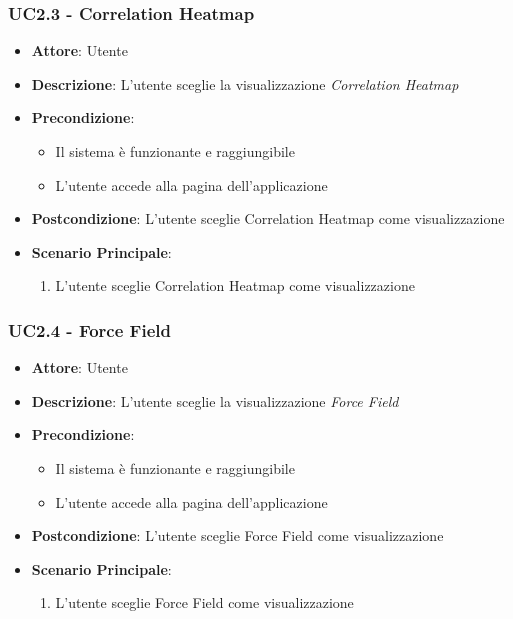     \subsubsection{UC2.3 - Correlation Heatmap}
    \label{uc2.3}
    
    \begin{itemize}
    \item \textbf{Attore}: Utente
    \item \textbf{Descrizione}: L'utente sceglie la visualizzazione \emph{Correlation Heatmap}
    \item \textbf{Precondizione}:
    \begin{itemize}
        \item Il sistema è funzionante e raggiungibile
        \item L'utente accede alla pagina dell'applicazione
    \end{itemize}
    \item \textbf{Postcondizione}: L'utente sceglie Correlation Heatmap come visualizzazione
    \item \textbf{Scenario Principale}: 
        \begin{enumerate}
            \item L'utente sceglie Correlation Heatmap come visualizzazione
        \end{enumerate}
    \end{itemize}
    
    \subsubsection{UC2.4 - Force Field}
    \label{uc2.4}
    
    \begin{itemize}
    \item \textbf{Attore}: Utente
    \item \textbf{Descrizione}: L'utente sceglie la visualizzazione \emph{Force Field}
    \item \textbf{Precondizione}:
    \begin{itemize}
        \item Il sistema è funzionante e raggiungibile
        \item L'utente accede alla pagina dell'applicazione
    \end{itemize}
    \item \textbf{Postcondizione}: L'utente sceglie Force Field come visualizzazione
    \item \textbf{Scenario Principale}: 
        \begin{enumerate}
            \item L'utente sceglie Force Field come visualizzazione
        \end{enumerate}
    \end{itemize}
    

